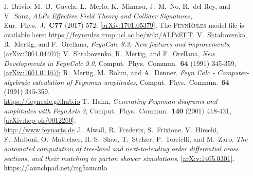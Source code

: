 \documentclass[12pt,a4wide]{article}
\begin{document}
\begin{thebibliography}{1}
    I.\ Brivio, M.\ B.\ Gavela, L.\ Merlo, K.\ Mimasu, J.\ M.\ No, R.\ del Rey, and V.\ Sanz, \textit{ALPs Effective Field Theory and Collider Signatures}, Eur.\ Phys.\ J.\ \textbf{C77} (2017) 572, [\href{https://arxiv.org/abs/1701.05379}{arXiv:1701.05379}]. The \textsc{FeynRules} model file is available here: \href{https://feynrules.irmp.ucl.ac.be/wiki/ALPsEFT}{https://feynrules.irmp.ucl.ac.be/wiki/ALPsEFT}. 
    V.\ Shtabovenko, R.\ Mertig, and F.\ Orellana, \textit{FeynCalc 9.3: New features and improvements}, [\href{https://arxiv.org/abs/2001.04407}{arXiv:2001.04407}]; V.\ Shtabovenko, R.\ Mertig, and F.\ Orellana, \textit{New Developments in FeynCalc 9.0}, Comput.\ Phys.\ Commun.\ \textbf{64} (1991) 345-359, [\href{https://arxiv.org/abs/1601.01167}{arXiv:1601.01167}]; R.\ Mertig, M.\ Böhm, and A.\ Denner, \textit{Feyn Calc - Computer-algebraic calculation of Feynman amplitudes}, Comput.\ Phys.\ Commun.\ \textbf{64} (1991) 345-359. \\ \href{https://feyncalc.github.io}{https://feyncalc.github.io} 
    T.\ Hahn, \textit{Generating Feynman diagrams and amplitudes with FeynArts 3}, Comput.\ Phys.\ Commun.\ \textbf{140} (2001) 418-431, [\href{https://arxiv.org/abs/hep-ph/0012260}{arXiv:hep-ph/0012260}]. \\ \href{http://www.feynarts.de}{http://www.feynarts.de} 
    J.\ Alwall, R.\ Frederix, S.\ Frixione, V.\ Hirschi, F.\ Maltoni, O.\ Mattelaer, H.-S.\ Shao, T.\ Stelzer, P.\ Torrielli, and M.\ Zaro, \textit{The automated computation of tree-level and next-to-leading order differential cross sections, and their matching to parton shower simulations}, [\href{https://arxiv.org/abs/1405.0301}{arXiv:1405.0301}]. \\ \href{https://launchpad.net/mg5amcnlo}{https://launchpad.net/mg5amcnlo} 
\end{thebibliography}
\end{document}
